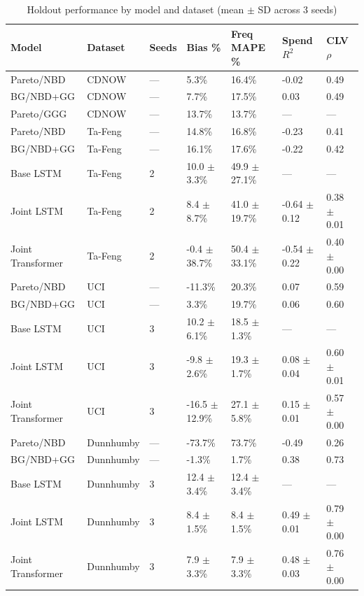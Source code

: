\begin{table}
\caption{Holdout performance by model and dataset (mean $\pm$ SD across 3 seeds)}
\label{tab:model_comparison_aggregated}
\begin{tabular}{lllllll}
\toprule
Model & Dataset & Seeds & Bias \% & Freq MAPE \% & Spend $R^2$ & CLV $\rho$ \\
\midrule
Pareto/NBD & CDNOW & — & 5.3\% & 16.4\% & -0.02 & 0.49 \\
BG/NBD+GG & CDNOW & — & 7.7\% & 17.5\% & 0.03 & 0.49 \\
Pareto/GGG & CDNOW & — & 13.7\% & 13.7\% & — & — \\
Pareto/NBD & Ta-Feng & — & 14.8\% & 16.8\% & -0.23 & 0.41 \\
BG/NBD+GG & Ta-Feng & — & 16.1\% & 17.6\% & -0.22 & 0.42 \\
Base LSTM & Ta-Feng & 2 & 10.0 $\pm$ 3.3\% & 49.9 $\pm$ 27.1\% & — & — \\
Joint LSTM & Ta-Feng & 2 & 8.4 $\pm$ 8.7\% & 41.0 $\pm$ 19.7\% & -0.64 $\pm$ 0.12 & 0.38 $\pm$ 0.01 \\
Joint Transformer & Ta-Feng & 2 & -0.4 $\pm$ 38.7\% & 50.4 $\pm$ 33.1\% & -0.54 $\pm$ 0.22 & 0.40 $\pm$ 0.00 \\
Pareto/NBD & UCI & — & -11.3\% & 20.3\% & 0.07 & 0.59 \\
BG/NBD+GG & UCI & — & 3.3\% & 19.7\% & 0.06 & 0.60 \\
Base LSTM & UCI & 3 & 10.2 $\pm$ 6.1\% & 18.5 $\pm$ 1.3\% & — & — \\
Joint LSTM & UCI & 3 & -9.8 $\pm$ 2.6\% & 19.3 $\pm$ 1.7\% & 0.08 $\pm$ 0.04 & 0.60 $\pm$ 0.01 \\
Joint Transformer & UCI & 3 & -16.5 $\pm$ 12.9\% & 27.1 $\pm$ 5.8\% & 0.15 $\pm$ 0.01 & 0.57 $\pm$ 0.00 \\
Pareto/NBD & Dunnhumby & — & -73.7\% & 73.7\% & -0.49 & 0.26 \\
BG/NBD+GG & Dunnhumby & — & -1.3\% & 1.7\% & 0.38 & 0.73 \\
Base LSTM & Dunnhumby & 3 & 12.4 $\pm$ 3.4\% & 12.4 $\pm$ 3.4\% & — & — \\
Joint LSTM & Dunnhumby & 3 & 8.4 $\pm$ 1.5\% & 8.4 $\pm$ 1.5\% & 0.49 $\pm$ 0.01 & 0.79 $\pm$ 0.00 \\
Joint Transformer & Dunnhumby & 3 & 7.9 $\pm$ 3.3\% & 7.9 $\pm$ 3.3\% & 0.48 $\pm$ 0.03 & 0.76 $\pm$ 0.00 \\
\bottomrule
\end{tabular}
\end{table}
